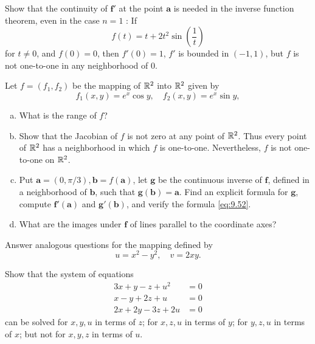 \begin{myExercise}
    \label{ex:9.16}
    Show that the continuity of $\mathbf{f}'$ at the point $\mathbf{a}$ is needed in the inverse function theorem, even in the case $n = 1$ : If
    \begin{equation*}
        f(t) = t+2t^2\sin \left( \frac{1}{t} \right)
    \end{equation*} 
    for $t \neq 0$, and $f(0) = 0$, then $f'(0) = 1$, $f'$ is bounded in $(-1, 1)$, 
    but $f$ is not one-to-one in any neighborhood of 0.
\end{myExercise}


\begin{myExercise}
    \label{ex:9.17}
    Let $f = (f_1,f_2)$ be the mapping of ${\protect\mathbb R}^2$ into ${\protect\mathbb R}^2$ given by
    \begin{equation*}
        f_1(x,y) = e^x \cos y, 
        \quad
        f_2(x,y) = e^x \sin y, 
    \end{equation*}
    \begin{enumerate}[(a)]
        \item What is the range of $f$?
        \item Show that the Jacobian of $f$ is not zero at any point of ${\protect\mathbb R}^2$. 
        Thus every point of ${\protect\mathbb R}^2$ has a neighborhood in which $f$ is one-to-one. 
        Nevertheless, $f$ is not one-to-one on ${\protect\mathbb R}^2$.
        \item Put $\mathbf{a} = (0, \pi/3), \mathbf{b} = f(\mathbf{a})$, let $\mathbf{g}$ be the continuous inverse of $\mathbf{f}$, 
        defined in a neighborhood of $\mathbf{b}$, such that $\mathbf{g(b) = a}$. 
        Find an explicit formula for $\mathbf{g}$, compute $\mathbf{f'(a)}$ and $\mathbf{g'(b)}$, and verify the formula \eqref{eq:9.52}. 
        \item What are the images under $\mathbf{f}$ of lines parallel to the coordinate axes?
    \end{enumerate}
\end{myExercise}


\begin{myExercise}
    \label{ex:9.18}
    Answer analogous questions for the mapping defined by
    \begin{equation*}
        u = x^2-y^2, 
        \quad 
        v = 2xy.
    \end{equation*}
\end{myExercise}


\begin{myExercise}
    \label{ex:9.19}
    Show that the system of equations 
    \begin{align*}
        3x +  y -  z +  u^2 &= 0 \\
         x -  y + 2z +  u   &= 0 \\
        2x + 2y - 3z + 2u   &= 0 
    \end{align*}
    can be solved 
            for $x, y, u$ in terms of $z$;
            for $x, z, u$ in terms of $y$;
            for $y, z, u$ in terms of $x$;
    but not for $x, y, z$ in terms of $u$.
\end{myExercise}

